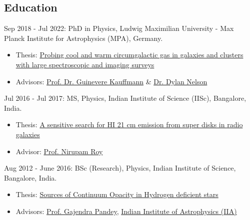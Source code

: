 \documentclass[12pt,letterpaper]{article}
\begin{document}
\subsection{Education}
\begin{list}{}{\cvlist}
  \item Sep 2018 - Jul 2022: PhD in Physics, Ludwig Maximilian University - Max Planck Institute for Astrophysics (MPA), Germany.
\begin{itemize}
    \item Thesis: \href{https://edoc.ub.uni-muenchen.de/30337/}{Probing cool and warm circumgalactic gas in galaxies and clusters with large spectroscopic and imaging surveys}
    \item Advisors: \href{https://www.mpa-garching.mpg.de/galaxyformation}{Prof. Dr. Guinevere Kauffmann} \& \href{https://www.ita.uni-heidelberg.de/~dnelson/}{Dr. Dylan Nelson}
\end{itemize}

\item Jul 2016 - Jul 2017: MS, Physics, Indian Institute of Science (IISc), Bangalore, India.
\begin{itemize}
    \item Thesis: \href{https://raw.githubusercontent.com/abhi0395/mycv/main/files/MS_thesis.pdf}{A sensitive search for HI 21 cm emission from super disks in radio galaxies}
    \item Advisor: \href{http://www.physics.iisc.ernet.in/%7Enroy/}{Prof. Nirupam Roy}
  \end{itemize}
\item Aug 2012 - June 2016: BSc (Research), Physics, Indian Institute of Science, Bangalore, India.
\begin{itemize}
    \item Thesis: \href{https://raw.githubusercontent.com/abhi0395/mycv/main/files/BS_thesis.pdf}{Sources of Continuum Opacity in Hydrogen deficient stars}
    \item Advisors: \href{https://www.iiap.res.in/?q=user/29}{Prof. Gajendra Pandey}, \href{https://www.iiap.res.in/}{Indian Institute of Astrophysics (IIA)}
  \end{itemize}
\end{list}
\end{document}
